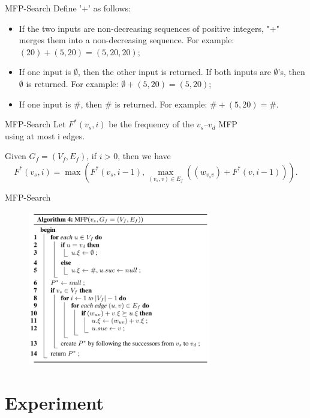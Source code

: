 \documentclass[mathserif]{beamer}
\begin{document}
\begin{frame}{MFP-Search}
Define '+' as follows:
\begin{itemize}
\item If the two inputs are non-decreasing sequences of positive integers, "+" merges them into a non-decreasing sequence. For example: $(20) + (5, 20) = (5, 20, 20)$;
\item If one input is $\emptyset{}$, then the other input is returned. If both inputs are $\emptyset{}$’s, then $\emptyset{}$ is returned. For example: $\emptyset{} + (5, 20) = (5, 20)$;
\item If one input is $\#$, then $\#$ is returned. For example: $\# + (5, 20) = \#$.
\end{itemize}
\end{frame}

\begin{frame}{MFP-Search}
Let $F^*(v_s, i)$ be the frequency of the $v_s–v_d$ MFP\\ using at most i edges.
\begin{lemm}
Given $G_f = (V_f,E_f)$, if $i > 0$, then we have
\begin{displaymath}
F^*(v_s,i) = \max(F^*(v_s,i−1), \max_{(v_s,v) \in{} E_f} ((w_{v_sv})+F^*(v,i−1))).
\end{displaymath}
\end{lemm}
\end{frame}

\begin{frame}{MFP-Search}
\begin{figure}
\includegraphics[width = 8cm]{alg4.png}
\end{figure}
\end{frame}

\section{Experiment}
\end{document}
